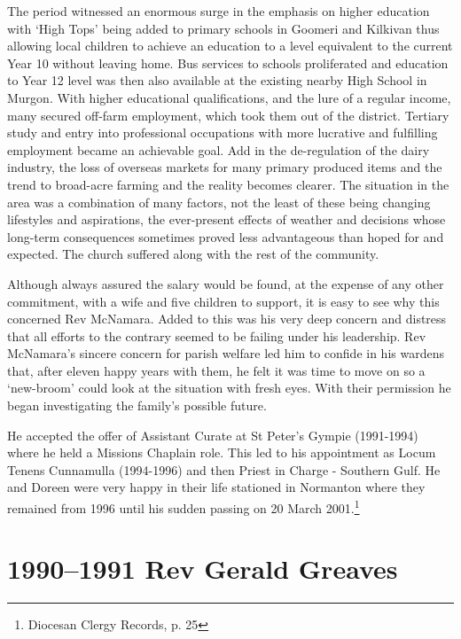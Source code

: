The period witnessed an enormous surge in the emphasis on higher education with `High Tops' being added to primary schools in Goomeri and Kilkivan thus allowing local children to achieve an education to a level equivalent to the current Year 10 without leaving home. Bus services to schools proliferated and education to Year 12 level was then also available at the existing nearby High School in Murgon. With higher educational qualifications, and the lure of a regular income, many secured off-farm employment, which took them out of the district. Tertiary study and entry into professional occupations with more lucrative and fulfilling employment became an achievable goal. Add in the de-regulation of the dairy industry, the loss of overseas markets for many primary produced items and the trend to broad-acre farming and the reality becomes clearer. The situation in the area was a combination of many factors, not the least of these being changing lifestyles and aspirations, the ever-present effects of weather and decisions whose long-term consequences sometimes proved less advantageous than hoped for and expected. The church suffered along with the rest of the community.



Although always assured the salary would be found, at the expense of any other commitment, with a wife and five children to support, it is easy to see why this concerned Rev McNamara. Added to this was his very deep concern and distress that all efforts to the contrary seemed to be failing under his leadership. Rev McNamara's sincere concern for parish welfare led him to confide in his wardens that, after eleven happy years with them, he felt it was time to move on so a `new-broom' could look at the situation with fresh eyes. With their permission he began investigating the family's possible future.



He accepted the offer of Assistant Curate at St Peter's Gympie (1991-1994) where he held a Missions Chaplain role. This led to his appointment as Locum Tenens Cunnamulla (1994-1996) and then Priest in Charge - Southern Gulf. He and Doreen were very happy in their life stationed in Normanton where they remained from 1996 until his sudden passing on 20 March 2001.\footnote{Diocesan Clergy Records, p. 25}


\section{1990--1991 Rev Gerald Greaves}



